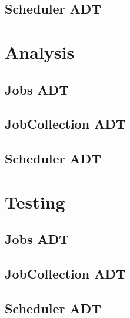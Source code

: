 \documentclass[12pt,a4paper]{article}
\begin{document}
		\subsection{Scheduler ADT}
	
	\section{Analysis}
		\subsection{Jobs ADT}
		\subsection{JobCollection ADT}
		\subsection{Scheduler ADT}

	\section{Testing}
		\subsection{Jobs ADT}
		\subsection{JobCollection ADT}
		\subsection{Scheduler ADT}
\end{document}
